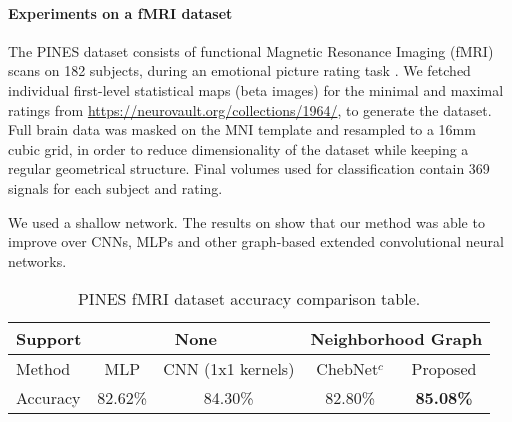 \paragraph{Experiments on a fMRI dataset}

The PINES dataset consists of functional Magnetic Resonance Imaging (fMRI) scans on 182 subjects, during an emotional picture rating task \citep{chang2015sensitive}. We fetched individual first-level statistical maps (beta images) for the minimal and maximal ratings from \url{https://neurovault.org/collections/1964/}, to generate the dataset. Full brain data was masked on the MNI template and resampled to a 16mm cubic grid, in order to reduce dimensionality of the dataset while keeping a regular geometrical structure. Final volumes used for classification contain 369 signals for each subject and rating. 

We used a shallow network. The results on  show that our method was able to improve over CNNs, MLPs and other graph-based extended convolutional neural networks.

\begin{table}[h]
\centering
\caption{PINES fMRI dataset accuracy comparison table.}
\label{tab:iaps-table}
\begin{tabular}{|l||c|c||c|c|}
\hline
\multicolumn{1}{|l||}{Support} & \multicolumn{2}{c||}{None} & \multicolumn{2}{c|}{Neighborhood Graph}     \\ \hline
Method                      & MLP & CNN (1x1 kernels)                                & ChebNet$^c$ & Proposed                   \\ \hline
Accuracy                    & 82.62\% & 84.30\%                            & 82.80\%                            & \textbf{85.08\%} \\ \hline
\end{tabular}
\end{table}

